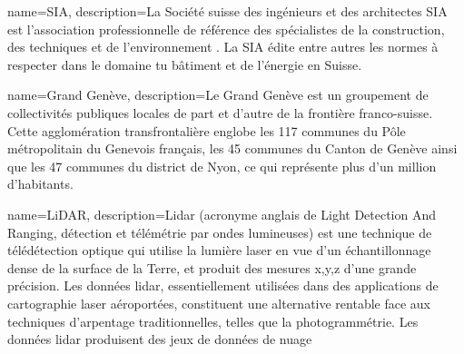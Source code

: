 {
    name=SIA,
    description={La Société suisse des ingénieurs et des architectes SIA est l’association professionnelle de référence des spécialistes de la construction, des techniques et de l’environnement \cite{sia_sia_nodate}. La SIA édite entre autres les normes à respecter dans le domaine tu bâtiment et de l'énergie en Suisse.}
}

{
    name=Grand Genève,
    description={Le Grand Genève est un groupement de collectivités publiques locales de part et d’autre de la frontière franco-suisse. Cette agglomération transfrontalière englobe les 117 communes du Pôle métropolitain du Genevois français, les 45 communes du Canton de Genève ainsi que les 47 communes du district de Nyon, ce qui représente plus d’un million d’habitants. \cite{noauthor_grand_nodate}}
}

{
    name=LiDAR,
    description={Lidar (acronyme anglais de Light Detection And Ranging, détection et télémétrie par ondes lumineuses) est une technique de télédétection optique qui utilise la lumière laser en vue d'un échantillonnage dense de la surface de la Terre, et produit des mesures x,y,z d'une grande précision. Les données lidar, essentiellement utilisées dans des applications de cartographie laser aéroportées, constituent une alternative rentable face aux techniques d’arpentage traditionnelles, telles que la photogrammétrie. Les données lidar produisent des jeux de données de nuage \cite{esri_quoi_2025}}
}







